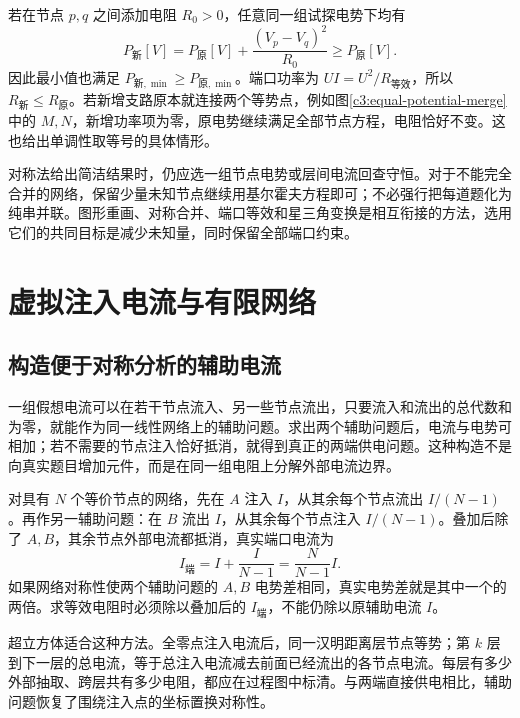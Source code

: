 若在节点 $p,q$ 之间添加电阻 $R_0>0$，任意同一组试探电势下均有
\[
 P_{\text{新}}[V]=P_{\text{原}}[V]+\frac{(V_p-V_q)^2}{R_0}
 \ge P_{\text{原}}[V].
\]
因此最小值也满足 $P_{\text{新},\min}\ge P_{\text{原},\min}$。端口功率为 $UI=U^2/R_{\text{等效}}$，所以 $R_{\text{新}}\le R_{\text{原}}$。若新增支路原本就连接两个等势点，例如图\ref{c3:equal-potential-merge}中的 $M,N$，新增功率项为零，原电势继续满足全部节点方程，电阻恰好不变。这也给出单调性取等号的具体情形。

对称法给出简洁结果时，仍应选一组节点电势或层间电流回查守恒。对于不能完全合并的网络，保留少量未知节点继续用基尔霍夫方程即可；不必强行把每道题化为纯串并联。图形重画、对称合并、端口等效和星三角变换是相互衔接的方法，选用它们的共同目标是减少未知量，同时保留全部端口约束。


\section{虚拟注入电流与有限网络}
\subsection{构造便于对称分析的辅助电流}

一组假想电流可以在若干节点流入、另一些节点流出，只要流入和流出的总代数和为零，就能作为同一线性网络上的辅助问题。求出两个辅助问题后，电流与电势可相加；若不需要的节点注入恰好抵消，就得到真正的两端供电问题。这种构造不是向真实题目增加元件，而是在同一组电阻上分解外部电流边界。

对具有 $N$ 个等价节点的网络，先在 $A$ 注入 $I$，从其余每个节点流出 $I/(N-1)$。再作另一辅助问题：在 $B$ 流出 $I$，从其余每个节点注入 $I/(N-1)$。叠加后除了 $A,B$，其余节点外部电流都抵消，真实端口电流为
\[
 I_{\text{端}}=I+\frac{I}{N-1}=\frac{N}{N-1}I.
\]
如果网络对称性使两个辅助问题的 $A,B$ 电势差相同，真实电势差就是其中一个的两倍。求等效电阻时必须除以叠加后的 $I_{\text{端}}$，不能仍除以原辅助电流 $I$。

超立方体适合这种方法。全零点注入电流后，同一汉明距离层节点等势；第 $k$ 层到下一层的总电流，等于总注入电流减去前面已经流出的各节点电流。每层有多少外部抽取、跨层共有多少电阻，都应在过程图中标清。与两端直接供电相比，辅助问题恢复了围绕注入点的坐标置换对称性。


